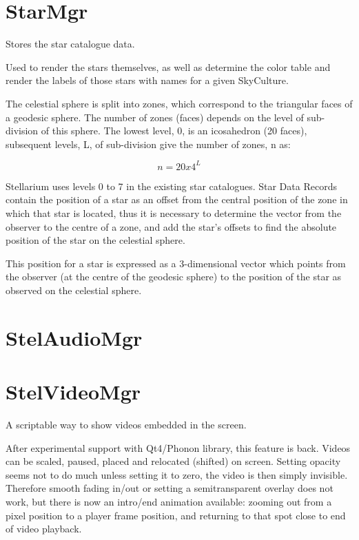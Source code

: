\section{StarMgr}
\label{sec:ScriptingAPI:StarMgr}

Stores the star catalogue data.

Used to render the stars themselves, as well as determine the color table and render the labels of those stars with names for a given SkyCulture.

The celestial sphere is split into zones, which correspond to the triangular faces of a geodesic sphere. The number of zones (faces) depends on the level of sub-division of this sphere. The lowest level, 0, is an icosahedron (20 faces), subsequent levels, L, of sub-division give the number of zones, n as:

\begin{equation}
n=20 x 4^L
\end{equation}

Stellarium uses levels 0 to 7 in the existing star catalogues. Star Data Records contain the position of a star as an offset from the central position of the zone in which that star is located, thus it is necessary to determine the vector from the observer to the centre of a zone, and add the star's offsets to find the absolute position of the star on the celestial sphere.

This position for a star is expressed as a 3-dimensional vector which points from the observer (at the centre of the geodesic sphere) to the position of the star as observed on the celestial sphere.

\section{StelAudioMgr}
\label{sec:ScriptingAPI:StelAudioMgr}

\section{StelVideoMgr}
\label{sec:ScriptingAPI:StelVideoMgr}

A scriptable way to show videos embedded in the screen.

After experimental support with Qt4/Phonon library, this feature is back. Videos can be scaled, paused, placed and relocated (shifted) on screen. Setting opacity seems not to do much unless setting it to zero, the video is then simply invisible. Therefore smooth fading in/out or setting a semitransparent overlay does not work, but there is now an intro/end animation available: zooming out from a pixel position to a player frame position, and returning to that spot close to end of video playback.

